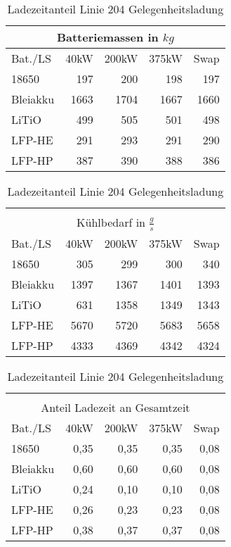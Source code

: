 \begin{table}
	\begin{minipage}{0.45\textwidth}
		\centering
		\begin{tabular}{lrrrr}
			\multicolumn{5}{c}{Batteriemassen in $kg$}   \\ \toprule
			Bat./LS  & 40kW & 200kW & 375kW &     Swap   \\ \midrule
			18650    &  197 &   200 &   198 &      197   \\
			Bleiakku & 1663 &  1704 &  1667 &     1660   \\
			LiTiO    &  499 &   505 &   501 &      498   \\
			LFP-HE   &  291 &   293 &   291 &      290   \\
			LFP-HP   &  387 &   390 &   388 &      386   \\ \bottomrule
		\end{tabular}
		\caption{Batteriemassen Linie 204 Gelegnheitsladung}
		\label{204_a}
		\begin{tabular}{lrrrr}
			         &      &       &       &  \\
			\multicolumn{5}{c}{Kühlbedarf in $\frac{g}{s}$}  \\ \toprule
			Bat./LS  & 40kW & 200kW & 375kW &          Swap   \\ \midrule
			18650    &  305 &   299 &   300 &           340   \\
			Bleiakku & 1397 &  1367 &  1401 &          1393   \\
			LiTiO    &  631 &  1358 &  1349 &          1343   \\
			LFP-HE   & 5670 &  5720 &  5683 &          5658   \\
			LFP-HP   & 4333 &  4369 &  4342 &          4324   \\ \bottomrule
		\end{tabular} 
		\caption{Kühlungsbedarf Linie 204 Gelegenheitsladung}
		
		\begin{tabular}{lrrrr}
			         &      &       &       &  \\
			\multicolumn{5}{c}{Anteil Ladezeit an Gesamtzeit} \\ \toprule
			Bat./LS  & 40kW & 200kW & 375kW &            Swap \\ \midrule
			18650    & 0,35 &  0,35 &  0,35 &            0,08 \\
			Bleiakku & 0,60 &  0,60 &  0,60 &            0,08 \\
			LiTiO    & 0,24 &  0,10 &  0,10 &            0,08 \\
			LFP-HE   & 0,26 &  0,23 &  0,23 &            0,08 \\
			LFP-HP   & 0,38 &  0,37 &  0,37 &            0,08 \\ \bottomrule
		\end{tabular} 
		\caption{Ladezeitanteil Linie 204 Gelegenheitsladung}
		

\end{minipage}
\end{table}
